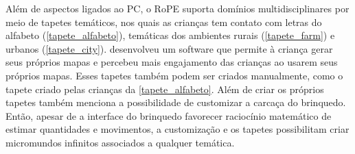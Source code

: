 Além de aspectos ligados ao PC, o RoPE suporta domínios multidisciplinares por meio de tapetes temáticos, nos quais as crianças tem contato com letras do alfabeto (\autoref{tapete_alfabeto}), temáticas dos ambientes rurais (\autoref{tapete_farm}) e urbanos (\autoref{tapete_city}).  desenvolveu um software que permite à criança gerar seus próprios mapas e percebeu mais engajamento das crianças ao usarem seus próprios mapas. Esses tapetes também podem ser criados manualmente, como o tapete criado pelas crianças da \autoref{tapete_alfabeto}. Além de criar os próprios tapetes  também menciona a possibilidade de customizar a carcaça do brinquedo. Então, apesar de a interface do brinquedo favorecer raciocínio matemático de estimar quantidades e movimentos, a customização e os tapetes possibilitam criar micromundos infinitos associados a qualquer temática.

